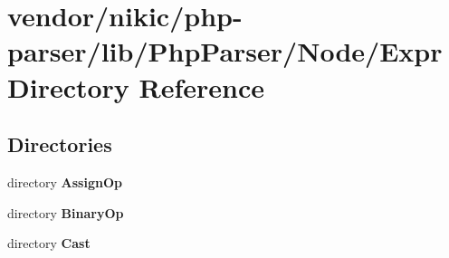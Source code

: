\section{vendor/nikic/php-\/parser/lib/\+Php\+Parser/\+Node/\+Expr Directory Reference}
\label{dir_d1fce028c1bd08f3457906ec6b0c46e7}
\subsection*{Directories}
\begin{DoxyCompactItemize}
\item 
directory {\bf Assign\+Op}
\item 
directory {\bf Binary\+Op}
\item 
directory {\bf Cast}
\end{DoxyCompactItemize}
